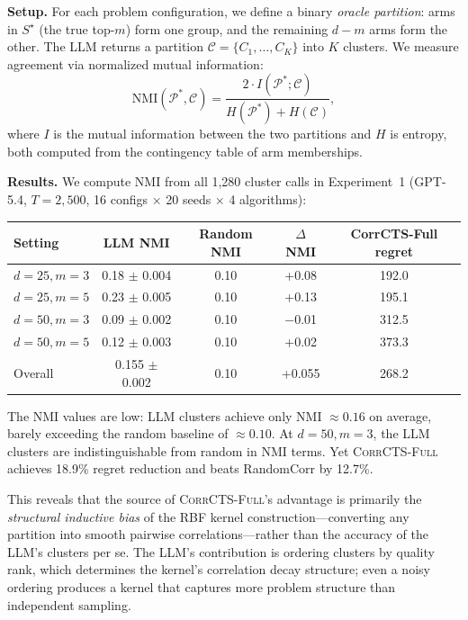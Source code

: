 \documentclass{article}
\theoremstyle{plain}
\theoremstyle{definition}
\theoremstyle{remark}
\newcommand{\opt}{S^{\star}}
\newcommand{\CorrFull}{\textsc{CorrCTS-Full}}
\begin{document}
\textbf{Setup.}
For each problem configuration, we define a binary \emph{oracle partition}: arms in $\opt$ (the true top-$m$) form one group, and the remaining $d - m$ arms form the other.
The LLM returns a partition $\mathcal{C} = \{C_1, \ldots, C_K\}$ into $K$ clusters.
We measure agreement via normalized mutual information:
\[
\text{NMI}(\mathcal{P}^*, \mathcal{C}) = \frac{2 \cdot I(\mathcal{P}^*; \mathcal{C})}{H(\mathcal{P}^*) + H(\mathcal{C})},
\]
where $I$ is the mutual information between the two partitions and $H$ is entropy, both computed from the contingency table of arm memberships.

\textbf{Results.}
We compute NMI from all 1{,}280 cluster calls in Experiment~1 (GPT-5.4, $T = 2{,}500$, 16 configs $\times$ 20 seeds $\times$ 4 algorithms):

\begin{center}
\small
\begin{tabular}{@{}lcccc@{}}
\toprule
Setting & LLM NMI & Random NMI & $\Delta$NMI & CorrCTS-Full regret \\
\midrule
$d\!=\!25, m\!=\!3$ & 0.18 $\pm$ 0.004 & 0.10 & +0.08 & 192.0 \\
$d\!=\!25, m\!=\!5$ & 0.23 $\pm$ 0.005 & 0.10 & +0.13 & 195.1 \\
$d\!=\!50, m\!=\!3$ & 0.09 $\pm$ 0.002 & 0.10 & $-$0.01 & 312.5 \\
$d\!=\!50, m\!=\!5$ & 0.12 $\pm$ 0.003 & 0.10 & +0.02 & 373.3 \\
\midrule
Overall & 0.155 $\pm$ 0.002 & 0.10 & +0.055 & 268.2 \\
\bottomrule
\end{tabular}
\end{center}

The NMI values are low: LLM clusters achieve only NMI $\approx 0.16$ on average, barely exceeding the random baseline of $\approx 0.10$.
At $d = 50, m = 3$, the LLM clusters are indistinguishable from random in NMI terms.
Yet \CorrFull{} achieves 18.9\% regret reduction and beats RandomCorr by 12.7\%.

This reveals that the source of \CorrFull{}'s advantage is primarily the \emph{structural inductive bias} of the RBF kernel construction---converting any partition into smooth pairwise correlations---rather than the accuracy of the LLM's clusters per se.
The LLM's contribution is ordering clusters by quality rank, which determines the kernel's correlation decay structure; even a noisy ordering produces a kernel that captures more problem structure than independent sampling.
\end{document}

